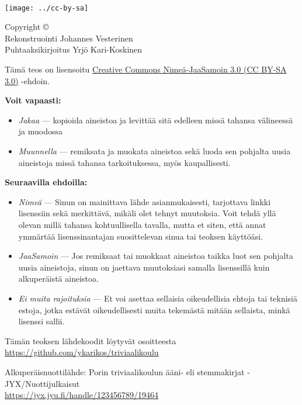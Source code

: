 \newpage
~\vfill
\thispagestyle{empty}
\setlength{\parindent}{0pt}
\setlength{\parskip}{\baselineskip}

\texttt{[image: ../cc-by-sa]}

Copyright \copyright\ \the\year \\
Rekonstruointi Johannes Vesterinen \\
Puhtaaksikirjoitus Yrjö Kari-Koskinen

Tämä teos on lisensoitu \href{https://creativecommons.org/licenses/by-sa/3.0/deed.fi}{Creative Commons Nimeä-JaaSamoin 3.0 (\textsc{CC BY-SA 3.0})} -ehdoin.

\textbf{Voit vapaasti:}
\begin{itemize}
	\item \emph{Jakaa} — kopioida aineistoa ja levittää sitä edelleen missä tahansa välineessä ja muodossa
	\item \emph{Muunnella} — remiksata ja muokata aineistoa sekä luoda sen pohjalta uusia aineistoja missä tahansa tarkoituksessa, myös kaupallisesti.
\end{itemize}

\textbf{Seuraavilla ehdoilla:}
\begin{itemize}

	\item \emph{Nimeä} — Sinun on mainittava lähde asianmukaisesti, tarjottava linkki lisenssiin sekä merkittävä, mikäli olet tehnyt muutoksia. Voit tehdä yllä olevan millä tahansa kohtuullisella tavalla, mutta et siten, että annat ymmärtää lisenssinantajan suosittelevan sinua tai teoksen käyttöäsi.

	\item \emph{JaaSamoin} — Jos remiksaat tai muokkaat aineistoa taikka luot sen pohjalta uusia aineistoja, sinun on jaettava muutoksiasi samalla lisenssillä kuin alkuperäistä aineistoa.

	\item \emph{Ei muita rajoituksia} — Et voi asettaa sellaisia oikeudellisia ehtoja tai teknisiä estoja, jotka estävät oikeudellisesti muita tekemästä mitään sellaista, minkä lisenssi sallii.
\end{itemize}

Tämän teoksen lähdekoodit löytyvät osoitteesta \url{https://github.com/ykarikos/triviaalikoulu}

Alkuperäisnuottilähde: Porin triviaalikoulun ääni- eli stemmakirjat - JYX/Nuottijulkaisut \\ \url{https://jyx.jyu.fi/handle/123456789/19464}


